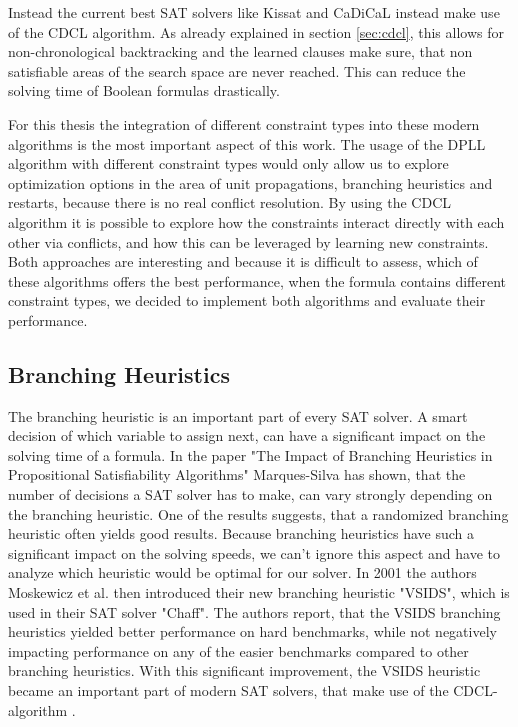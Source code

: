 Instead the current best SAT solvers like Kissat \cite{BiereFazekasFleuryHeisinger-SAT-Competition-2020-solvers} and CaDiCaL \cite{Biere-SAT-Competition-2017-solvers} instead make use of the CDCL algorithm. As already explained in section \ref{sec:cdcl}, this allows for non-chronological backtracking and the learned clauses make sure, that non satisfiable areas of the search space are never reached. This can reduce the solving time of Boolean formulas drastically. 

For this thesis the integration of different constraint types into these modern algorithms is the most important aspect of this work. The usage of the DPLL algorithm with different constraint types would only allow us to explore optimization options in the area of unit propagations, branching heuristics and restarts, because there is no real conflict resolution. By using the CDCL algorithm it is possible to explore how the constraints interact directly with each other via conflicts, and how this can be leveraged by learning new constraints. Both approaches are interesting and because it is difficult to assess, which of these algorithms offers the best performance, when the formula contains different constraint types, we decided to implement both algorithms and evaluate their performance.

\subsection{Branching Heuristics}

The branching heuristic is an important part of every SAT solver. A smart decision of which variable to assign next, can have a significant impact on the solving time of a formula. In the paper "The Impact of Branching Heuristics in
Propositional Satisfiability Algorithms" \cite{marques1999impact} Marques-Silva has shown, that the number of decisions a SAT solver has to make, can vary strongly depending on the branching heuristic. One of the results suggests, that a randomized branching heuristic often yields good results. Because branching heuristics have such a significant impact on the solving speeds, we can't ignore this aspect and have to analyze which heuristic would be optimal for our solver. In 2001 the authors Moskewicz et al. \cite{moskewicz2001chaff} then introduced their new branching heuristic "VSIDS", which is used in their SAT solver "Chaff". The authors report, that the VSIDS branching heuristics yielded better performance on hard benchmarks, while not negatively impacting performance on any of the easier benchmarks \cite{moskewicz2001chaff} compared to other branching heuristics. With this significant improvement, the VSIDS heuristic became an important part of modern SAT solvers, that make use of the CDCL-algorithm \cite{biere2015evaluating}. 

